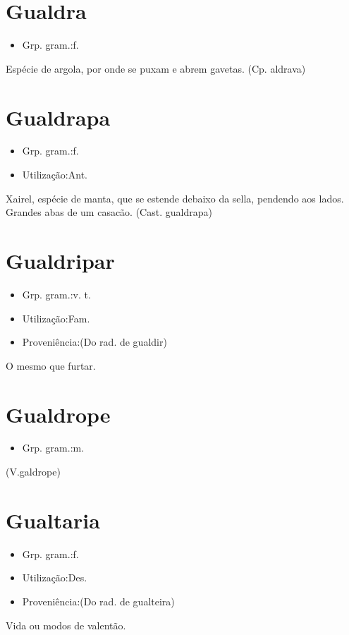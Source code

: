 \section{Gualdra}
\begin{itemize}
\item {Grp. gram.:f.}
\end{itemize}
Espécie de argola, por onde se puxam e abrem gavetas.
(Cp. \textunderscore aldrava\textunderscore )
\section{Gualdrapa}
\begin{itemize}
\item {Grp. gram.:f.}
\end{itemize}
\begin{itemize}
\item {Utilização:Ant.}
\end{itemize}
Xairel, espécie de manta, que se estende debaixo da sella, pendendo aos lados.
Grandes abas de um casacão.
(Cast. \textunderscore gualdrapa\textunderscore )
\section{Gualdripar}
\begin{itemize}
\item {Grp. gram.:v. t.}
\end{itemize}
\begin{itemize}
\item {Utilização:Fam.}
\end{itemize}
\begin{itemize}
\item {Proveniência:(Do rad. de \textunderscore gualdir\textunderscore )}
\end{itemize}
O mesmo que \textunderscore furtar\textunderscore .
\section{Gualdrope}
\begin{itemize}
\item {Grp. gram.:m.}
\end{itemize}
(V.galdrope)
\section{Gualtaria}
\begin{itemize}
\item {Grp. gram.:f.}
\end{itemize}
\begin{itemize}
\item {Utilização:Des.}
\end{itemize}
\begin{itemize}
\item {Proveniência:(Do rad. de \textunderscore gualteira\textunderscore )}
\end{itemize}
Vida ou modos de valentão.
